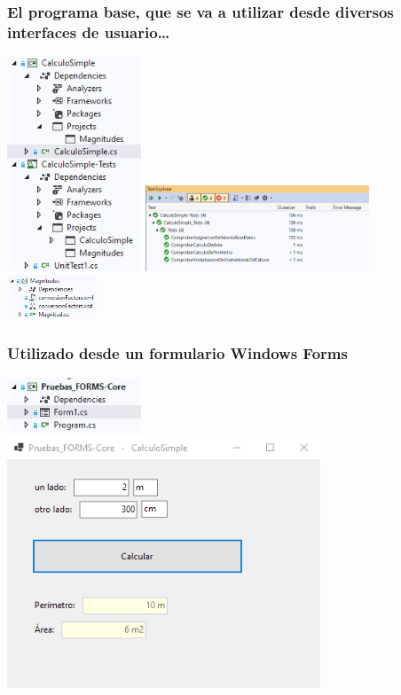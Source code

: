 \documentclass[spanish,12pt,a4paper,final,oneside]{book}
\begin{document}
\subsubsection{El programa base, que se va a utilizar desde diversos interfaces de usuario…}

\includegraphics[width=0.3\textwidth]{CalculoSimple_codigo.png} 
\includegraphics[width=0.5\textwidth]{CalculoSimple_tests.png} 
\includegraphics[width=0.2\textwidth]{CalculoSimple_magnitudes.png} 



\subsubsection{Utilizado desde un formulario Windows Forms}
\includegraphics[width=0.3\textwidth]{WindowsForms_codigo.png} 
\includegraphics[width=0.7\textwidth]{WindowsForms_pantallazo.png} 

\end{document}
